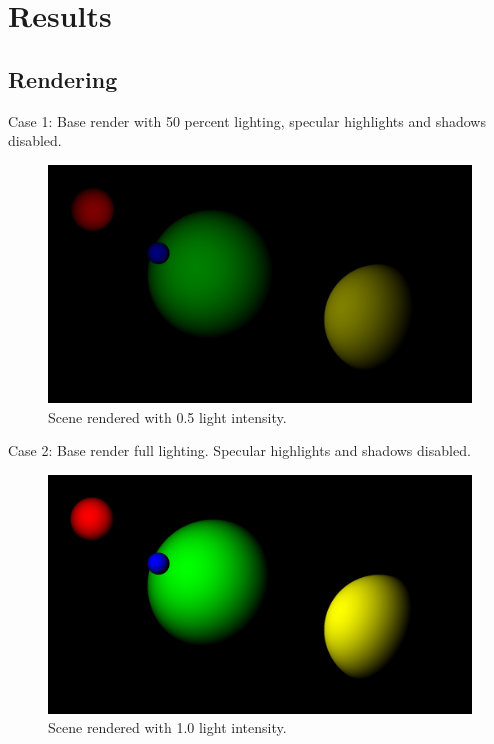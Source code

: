\documentclass{article}
\begin{document}
\newpage
\section{Results}
\subsection{Rendering}


Case 1: Base render with 50 percent lighting, specular highlights and shadows disabled.
\begin{figure}[H]
  \includegraphics[width=\linewidth]{one.png}
  \caption{Scene rendered with 0.5 light intensity.}
  \label{fig:case1}
\end{figure}

Case 2: Base render full lighting. Specular highlights and shadows disabled.
\begin{figure}[H]
  \includegraphics[width=\linewidth]{two.png}
  \caption{Scene rendered with 1.0 light intensity.}
  \label{fig:case2}
\end{figure}
\end{document}
